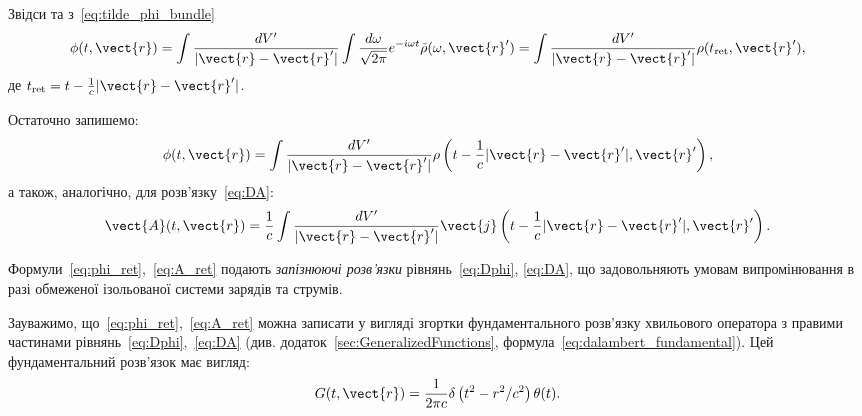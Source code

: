 Звідси та з~\eqref{eq:tilde_phi_bundle}
\begin{equation}
	\phi (t, \vect{r}) = \int \frac{dV'}{|\vect{r} - \vect{r}'|} \int \frac{d\omega}{\sqrt{2\pi}} e^{-i\omega t} \tilde{\rho} (\omega, \vect{r}')
	= \int \frac{dV'}{|\vect{r} - \vect{r}'|} \rho (t_{\text{ret}}, \vect{r}'),
\end{equation}
де $t_{\text{ret}} = t - \frac{1}{c} |\vect{r} - \vect{r}'|$.

Остаточно запишемо:
\begin{equation}\label{eq:phi_ret}
	\phi (t, \vect{r}) = \int \frac{dV'}{|\vect{r} - \vect{r}'|} \rho \left( t - \frac{1}{c} |\vect{r} - \vect{r}'|, \vect{r}' \right),
\end{equation}
а також, аналогічно, для розв'язку~\eqref{eq:DA}:
\begin{equation}\label{eq:A_ret}
	\vect{A} (t, \vect{r}) = \frac{1}{c} \int \frac{dV'}{|\vect{r} - \vect{r}'|} \vect{j} \left( t - \frac{1}{c} |\vect{r} - \vect{r}'|,
	\vect{r}' \right).
\end{equation}

Формули~\eqref{eq:phi_ret},~\eqref{eq:A_ret} подають \textit{запізнюючі розв'язки} рівнянь~\eqref{eq:Dphi},
\eqref{eq:DA}, що задовольняють умовам випромінювання в разі обмеженої ізольованої системи зарядів та струмів.

Зауважимо, що~\eqref{eq:phi_ret},~\eqref{eq:A_ret} можна записати у вигляді згортки фундаментального розв'язку хвильового оператора
з правими частинами рівнянь~\eqref{eq:Dphi},~\eqref{eq:DA} (див. додаток~\ref{sec:GeneralizedFunctions}, формула~\eqref{eq:dalambert_fundamental}). Цей
фундаментальний розв'язок має вигляд:
\begin{equation}\label{eq:G}
	G(t, \vect{r}) = \frac{1}{2\pi c} \delta \left( t^2 - r^2 / c^2 \right) \theta(t).
\end{equation}

